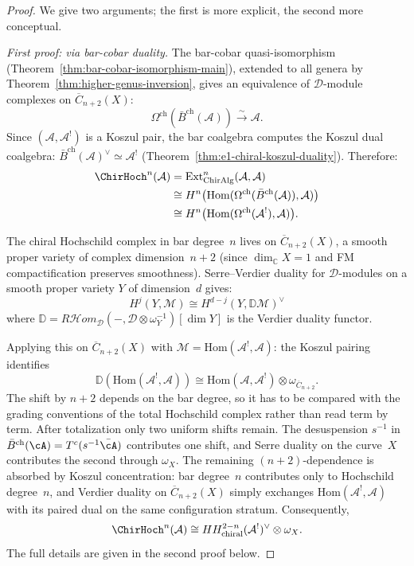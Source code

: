 \begin{proof}
We give two arguments; the first is more explicit, the second more conceptual.

\medskip\noindent\emph{First proof: via bar-cobar duality.}
The bar-cobar quasi-isomorphism (Theorem~\ref{thm:bar-cobar-isomorphism-main}),
extended to all genera by Theorem~\ref{thm:higher-genus-inversion}, gives an
equivalence of $\mathcal{D}$-module complexes on $\overline{C}_{n+2}(X)$:
\[
\Omega^{\mathrm{ch}}(\bar{B}^{\mathrm{ch}}(\mathcal{A}))
\xrightarrow{\;\sim\;} \mathcal{A}.
\]
Since $(\mathcal{A}, \mathcal{A}^!)$ is a Koszul pair, the bar coalgebra
computes the Koszul dual coalgebra:
$\bar{B}^{\mathrm{ch}}(\mathcal{A})^{\vee} \simeq \mathcal{A}^!$
(Theorem~\ref{thm:e1-chiral-koszul-duality}).  Therefore:
\begin{align}
\ChirHoch^n(\mathcal{A})
&= \mathrm{Ext}^n_{\mathrm{ChirAlg}}(\mathcal{A}, \mathcal{A}) \notag \\
&\cong H^n\bigl(\mathrm{Hom}(\Omega^{\mathrm{ch}}(\bar{B}^{\mathrm{ch}}(\mathcal{A})), \mathcal{A})\bigr) \notag \\
&\cong H^n\bigl(\mathrm{Hom}(\Omega^{\mathrm{ch}}(\mathcal{A}^!), \mathcal{A})\bigr). \label{eq:hh-via-hom}
\end{align}

The chiral Hochschild complex in bar degree~$n$ lives on
$\overline{C}_{n+2}(X)$, a smooth proper variety of complex dimension~$n+2$
(since $\dim_{\mathbb{C}} X = 1$ and FM compactification preserves smoothness).
Serre--Verdier duality for $\mathcal{D}$-modules on a smooth proper variety
$Y$ of dimension~$d$ gives:
\[
H^j(Y, \mathcal{M}) \cong H^{d-j}(Y, \mathbb{D}\mathcal{M})^{\vee}
\]
where $\mathbb{D} = R\mathcal{H}\!\mathit{om}_{\mathcal{D}}({-}, \mathcal{D} \otimes \omega_Y^{-1})[\dim Y]$
is the Verdier duality functor.

Applying this on $\overline{C}_{n+2}(X)$ with
$\mathcal{M} = \mathrm{Hom}(\mathcal{A}^!, \mathcal{A})$:
the Koszul pairing identifies
\[
\mathbb{D}(\mathrm{Hom}(\mathcal{A}^!, \mathcal{A}))
\cong \mathrm{Hom}(\mathcal{A}, \mathcal{A}^!)
\otimes \omega_{\overline{C}_{n+2}}.
\]
The shift by $n+2$ depends on the bar degree, so it has to be compared
with the grading conventions of the total Hochschild complex rather
than read term by term.  After totalization only two uniform shifts
remain.  The desuspension $s^{-1}$ in
$\bar{B}^{\mathrm{ch}}(\cA) = T^c(s^{-1}\bar{\cA})$ contributes one
shift, and Serre duality on the curve~$X$ contributes the second
through $\omega_X$.  The remaining $(n+2)$-dependence is absorbed by
Koszul concentration: bar degree~$n$ contributes only to Hochschild
degree~$n$, and Verdier duality on $\overline{C}_{n+2}(X)$ simply
exchanges $\mathrm{Hom}(\mathcal{A}^!, \mathcal{A})$ with its paired
dual on the same configuration stratum.  Consequently,
\[
\ChirHoch^n(\mathcal{A})
\cong HH^{2-n}_{\mathrm{chiral}}(\mathcal{A}^!)^{\vee} \otimes \omega_X.
\]
The full details are given in the second proof below.


\end{proof}
